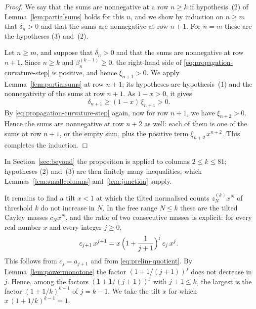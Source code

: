 \documentclass{amsart}
\makeatletter
\theoremstyle{definition}
\theoremstyle{remark}
\numberwithin{equation}{section}
\def\subsection{\@startsection{subsection}{2}\z@{.5\linespacing\@plus.7\linespacing}{-.5em}{\normalfont\bfseries\boldmath}}
\makeatother
\begin{document}
\begin{proof}
We say that the sums are nonnegative at a row $n\ge k$ if hypothesis~(2) of
Lemma~\ref{lem:partialsums} holds for this $n$, and we show by induction on
$n\ge m$ that $\delta_n>0$ and that the sums are nonnegative at row
$n+1$. For $n=m$ these are the hypotheses (3) and~(2).

Let $n\ge m$, and suppose that $\delta_n>0$ and that the sums are nonnegative
at row $n+1$. Since $n\ge k$ and $\beta^{(k-1)}_n\ge0$, the right-hand
side of \eqref{eq:propagation-curvature-step} is positive, and hence
$\xi_{n+1}>0$. We apply Lemma~\ref{lem:partialsums} at row $n+1$; its
hypotheses are hypothesis~(1) and the nonnegativity of the sums at row
$n+1$. As $1-x>0$, it gives
\[
\delta_{n+1}\ge(1-x)\,\xi_{n+1}>0 .
\]
By \eqref{eq:propagation-curvature-step} again, now for row $n+1$, we
have $\xi_{n+2}>0$. Hence the sums are nonnegative at row $n+2$ as well:
each of them is one of the sums at row $n+1$, or the empty sum, plus the
positive term $\xi_{n+2}\,x^{n+2}$. This completes the induction.
\end{proof}

In Section~\ref{sec:beyond} the proposition is applied to columns
$2\le k\le81$; hypotheses (2) and~(3) are then finitely many inequalities,
which Lemmas~\ref{lem:smallcolumns} and~\ref{lem:junction} supply.

\subsection{The critical tilt}\label{subsec:propagation-tilt}

It remains to find a tilt $x<1$ at which the tilted normalised counts
$z^{(k)}_Nx^N$ of threshold $k$ do not increase in $N$. In the free range
$N\le k$ these are the tilted Cayley masses $c_Nx^N$, and the ratio of two
consecutive masses is explicit: for every real number $x$ and every integer
$j\ge0$,
\begin{equation}\label{eq:propagation-ratio}
c_{j+1}\,x^{j+1}=x\,\Bigl(1+\frac{1}{j+1}\Bigr)^{j}\,c_j\,x^j .
\end{equation}
This follows from $c_j=a_{j+1}$ and from \eqref{eq:prelim-quotient}. By
Lemma~\ref{lem:powermonotone} the factor $(1+1/(j+1))^{j}$ does not decrease
in $j$. Hence, among the factors $(1+1/(j+1))^{j}$ with $j+1\le k$, the
largest is the factor $(1+1/k)^{k-1}$ of $j=k-1$.
We take the tilt $x$ for which $x\,(1+1/k)^{k-1}=1$.
\end{document}
